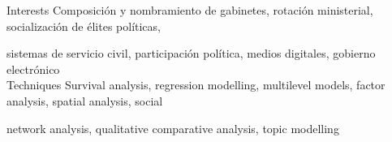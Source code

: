





\begin{cvskills}

\cvskill
{Interests}
{Composición y nombramiento de gabinetes, rotación ministerial, socialización de élites políticas,}

\cvskill
{}
{sistemas de servicio civil, participación política, medios digitales, gobierno electrónico}\\

\cvskill
{Techniques} 
{Survival analysis, regression modelling, multilevel models, factor analysis, spatial analysis, social}

\cvskill
{} 
{network analysis, qualitative comparative analysis, topic modelling} \\

\end{cvskills}

